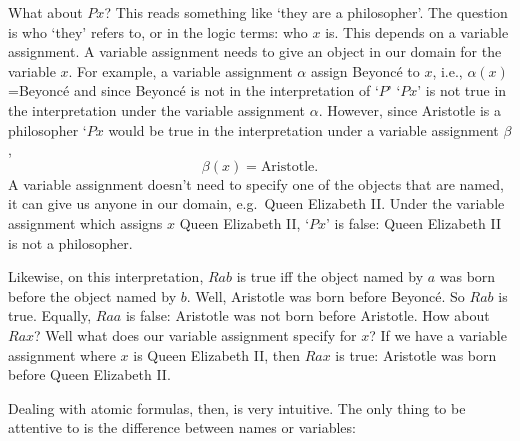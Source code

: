 What about $Px$? This reads something like `they are a philosopher'. The question is who `they' refers to, or in the logic terms: who $x$ is. This depends on a variable assignment. A variable assignment needs to give an object in our domain for the variable $x$. For example, a variable assignment $\alpha$  assign Beyonc\'e to $x$, i.e., $\alpha(x)$=Beyonc\'e and since Beyonc\'e is not in the interpretation of `$P$' `$Px$' is not true in the interpretation under the variable assignment $\alpha$. However, since Aristotle is a philosopher `$Px$ would be true in the interpretation under a variable assignment $\beta$, $$\beta(x)=\text{Aristotle}.$$
A variable assignment doesn't need to specify one of the objects that are named, it can give us anyone in our domain, e.g.~Queen Elizabeth II. Under the variable assignment which assigns $x$ Queen Elizabeth II, `$Px$' is false: Queen Elizabeth II is not a philosopher.


Likewise, on this interpretation, $Rab$ is true iff the object named by $a$ was born before the object named by $b$. Well, Aristotle was born before Beyonc\'e. So $Rab$ is true. Equally, $Raa$ is false: Aristotle was not born before Aristotle. How about $Rax$? Well what does our variable assignment specify for $x$? If we have a variable assignment where $x$ is Queen Elizabeth II, then $Rax$ is true: Aristotle was born before Queen Elizabeth II.

Dealing with atomic formulas, then, is very intuitive. The only thing to be attentive to is the difference between names or variables:

